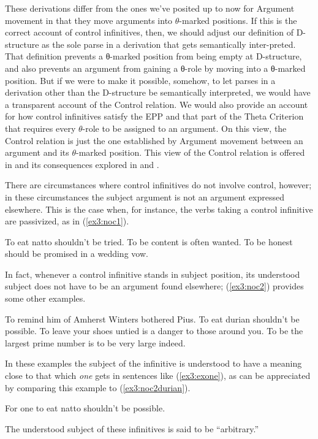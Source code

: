 These derivations differ from the ones we've posited up to now for Argument movement in that they move arguments into \mbox{$\theta$-marked} positions. If this is the correct account of control infinitives, then, we should adjust our definition of D-structure as the sole parse in a derivation that gets semantically inter-preted. That definition prevents a θ-marked position from being empty at D-structure, and also prevents an argument from gaining a θ-role by moving into a θ-marked position. But if we were to make it possible, somehow, to let parses in a derivation other than the D-structure be semantically interpreted, we would have a transparent account of the Control relation. We would also provide an account for how control infinitives satisfy the EPP and that part of the Theta Criterion that requires every \mbox{$\theta$-role} to be assigned to an argument. On this view, the Control relation is just the one established by Argument movement between an argument and its \mbox{$\theta$-marked} position. This view of the Control relation is offered in \citet{Hornstein:1999} and its consequences explored in \citet{Hornstein:2000} and \citet{Boeckx:2003a,Boeckx:2004b,Boeckx:2006c,Boeckx:2006b}.

There are circumstances where control infinitives do not involve control, however; in these circumstances the subject argument is not an argument expressed elsewhere. This is the case when, for instance, the verbs taking a control infinitive are passivized, as in (\ref{ex3:noc1}).
\begin{exe}
\ex \label{ex3:noc1} 
\begin{xlist}
	\ex To eat natto shouldn't be tried.
	\ex To be content is often wanted.
	\ex To be honest should be promised in a wedding vow.
\end{xlist}
\end{exe}
In fact, whenever a control infinitive stands in subject position, its understood subject does not have to be an argument found elsewhere; (\ref{ex3:noc2}) provides some other examples.\enlargethispage*{20pt}
\begin{exe}
\ex \label{ex3:noc2} 
\begin{xlist}
	\ex To remind him of Amherst Winters bothered Pius.
	\ex \label{ex3:noc2durian}To eat durian shouldn't be possible.
	\ex To leave your shoes untied is a danger to those around you.
	\ex To be the largest prime number is to be very large indeed.
\end{xlist}
\end{exe}
In these examples the subject of the infinitive is understood to have a meaning close to that which \emph{one} gets in sentences like (\ref{ex3:exone}), as can be appreciated by comparing this example to (\ref{ex3:noc2durian}).
\begin{exe}
\ex \label{ex3:exone} For one to eat natto shouldn't be possible.
\end{exe}
The understood subject of these infinitives is said to be ``arbitrary.'' 

